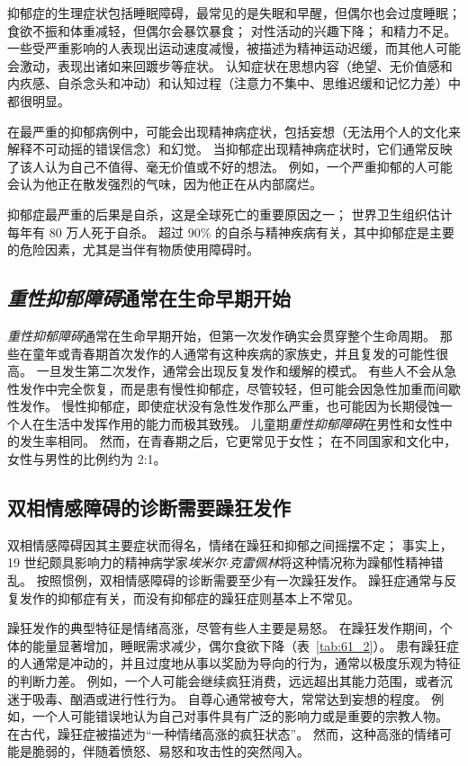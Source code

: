 抑郁症的生理症状包括睡眠障碍，最常见的是失眠和早醒，但偶尔也会过度睡眠；
食欲不振和体重减轻，但偶尔会暴饮暴食；
对性活动的兴趣下降；
和精力不足。
一些受严重影响的人表现出运动速度减慢，被描述为精神运动迟缓，而其他人可能会激动，表现出诸如来回踱步等症状。
认知症状在思想内容（绝望、无价值感和内疚感、自杀念头和冲动）和认知过程（注意力不集中、思维迟缓和记忆力差）中都很明显。


在最严重的抑郁病例中，可能会出现精神病症状，包括妄想（无法用个人的文化来解释不可动摇的错误信念）和幻觉。
当抑郁症出现精神病症状时，它们通常反映了该人认为自己不值得、毫无价值或不好的想法。
例如，一个严重抑郁的人可能会认为他正在散发强烈的气味，因为他正在从内部腐烂。


抑郁症最严重的后果是自杀，这是全球死亡的重要原因之一；
世界卫生组织估计每年有 80 万人死于自杀。
超过 90\% 的自杀与精神疾病有关，其中抑郁症是主要的危险因素，尤其是当伴有物质使用障碍时。



\subsection{\textit{重性抑郁障碍}通常在生命早期开始}

\textit{重性抑郁障碍}通常在生命早期开始，但第一次发作确实会贯穿整个生命周期。
那些在童年或青春期首次发作的人通常有这种疾病的家族史，并且复发的可能性很高。
一旦发生第二次发作，通常会出现反复发作和缓解的模式。
有些人不会从急性发作中完全恢复，而是患有慢性抑郁症，尽管较轻，但可能会因急性加重而间歇性发作。
慢性抑郁症，即使症状没有急性发作那么严重，也可能因为长期侵蚀一个人在生活中发挥作用的能力而极其致残。
儿童期\textit{重性抑郁障碍}在男性和女性中的发生率相同。
然而，在青春期之后，它更常见于女性；
在不同国家和文化中，女性与男性的比例约为 2:1。



\subsection{双相情感障碍的诊断需要躁狂发作}

双相情感障碍因其主要症状而得名，情绪在躁狂和抑郁之间摇摆不定；
事实上，19 世纪颇具影响力的精神病学家\textit{埃米尔$\cdot$克雷佩林}将这种情况称为躁郁性精神错乱。
按照惯例，双相情感障碍的诊断需要至少有一次躁狂发作。
躁狂症通常与反复发作的抑郁症有关，而没有抑郁症的躁狂症则基本上不常见。


躁狂发作的典型特征是情绪高涨，尽管有些人主要是易怒。
在躁狂发作期间，个体的能量显著增加，睡眠需求减少，偶尔食欲下降（表~\ref{tab:61_2}）。
患有躁狂症的人通常是冲动的，并且过度地从事以奖励为导向的行为，通常以极度乐观为特征的判断力差。
例如，一个人可能会继续疯狂消费，远远超出其能力范围，或者沉迷于吸毒、酗酒或进行性行为。
自尊心通常被夸大，常常达到妄想的程度。
例如，一个人可能错误地认为自己对事件具有广泛的影响力或是重要的宗教人物。
在古代，躁狂症被描述为“一种情绪高涨的疯狂状态”。
然而，这种高涨的情绪可能是脆弱的，伴随着愤怒、易怒和攻击性的突然闯入。


